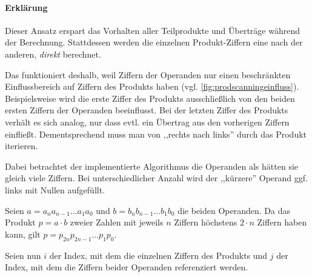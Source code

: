     \paragraph*{Erklärung}
    Dieser Ansatz erspart das Vorhalten aller Teilprodukte und Überträge während der Berechnung. Stattdessen werden die einzelnen Produkt-Ziffern eine nach der anderen, \emph{direkt} berechnet.

    Das funktioniert deshalb, weil Ziffern der Operanden nur einen beschränkten Einflussbereich auf Ziffern des Produkts haben (vgl. \autoref{fig:prodscanningeinfluss}). Beispielsweise wird die erste Ziffer des Produkts ausschließlich von den beiden ersten Ziffern der Operanden beeinflusst. Bei der letzten Ziffer des Produkts verhält es sich analog, nur dass evtl. ein Übertrag aus den vorherigen Ziffern einfließt. Dementsprechend muss man von ,,rechts nach links'' durch das Produkt iterieren.

    Dabei betrachtet der implementierte Algorithmus die Operanden als hätten sie gleich viele Ziffern. Bei unterschiedlicher Anzahl wird der ,,kürzere'' Operand ggf. links mit Nullen aufgefüllt.

    Seien $a=a_{n}a_{n-1}\dots{}a_{1}a_{0}$ und $b=b_{n}b_{n-1}\dots{}b_{1}b_{0}$ die beiden Operanden.
    Da das Produkt $p = a \cdot b$ zweier Zahlen mit jeweils $n$ Ziffern höchstens $2 \cdot n$ Ziffern haben kann, gilt $p=p_{2n}p_{2 n-1}\dots{}p_{1}p_{0}$.

    Seien nun $i$ der Index, mit dem die einzelnen Ziffern des Produkts
    und $j$ der Index, mit dem die Ziffern beider Operanden referenziert werden.

